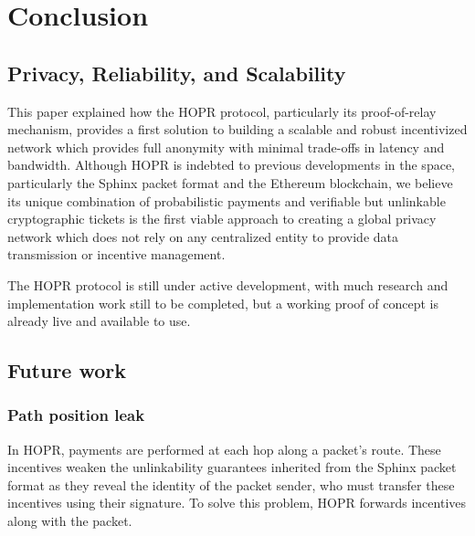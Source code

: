 \section{Conclusion}

\subsection{Privacy, Reliability, and Scalability}

This paper explained how the HOPR protocol, particularly its proof-of-relay mechanism, provides a first solution to building a scalable and robust incentivized network which provides full anonymity with minimal trade-offs in latency and bandwidth. Although HOPR is indebted to previous developments in the space, particularly the Sphinx packet format and the Ethereum blockchain, we believe its unique combination of probabilistic payments and verifiable but unlinkable cryptographic tickets is the first viable approach to creating a global privacy network which does not rely on any centralized entity to provide data transmission or incentive management.

The HOPR protocol is still under active development, with much research and implementation work still to be completed, but a working proof of concept is already live and available to use. 

\subsection{Future work}

\subsubsection{Path position leak}

In HOPR, payments are performed at each hop along a packet’s route. These
incentives weaken the unlinkability guarantees inherited from the Sphinx packet
format \cite{sphinxpaper} as they reveal the identity of the packet sender, who
must transfer these incentives using their signature. To solve this
problem, HOPR forwards incentives along with the packet.

